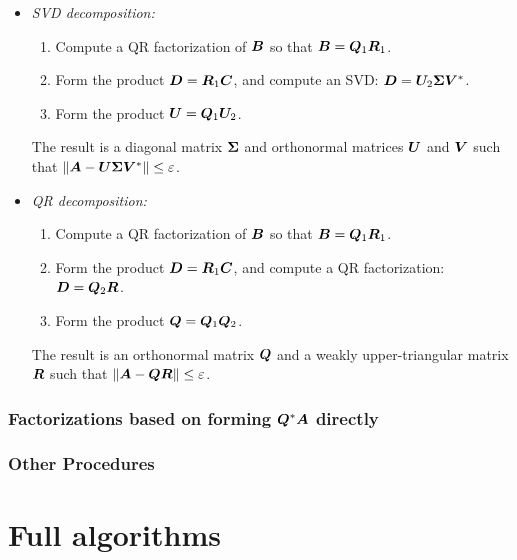 \begin{itemize}
  \item \textit{SVD decomposition:}
\lsp
\begin{enumerate}
\item Compute a QR factorization of $\bm{B}$ so that $\bm{B} = \bm{Q}_{1}\bm{R}_{1}$.
\item Form the product $\bm{D} = \bm{R}_{1}\bm{C}$, and compute an SVD:
      $\bm{D} = \bm{U}_{2}\bm{\Sigma}\bm{V}^{*}$.
\item Form the product $\bm{U} = \bm{Q}_{1}\bm{U}_{2}$.
\end{enumerate}
\lsp
The result is a diagonal matrix $\bm{\Sigma}$ and orthonormal matrices $\bm{U}$ and $\bm{V}$
such that $\left\Vert {\bm{A} - \bm{U}\bm{\Sigma}\bm{V}^{*}} \right\Vert \leq \varepsilon$.

\item \textit{QR decomposition:}
\lsp
\begin{enumerate}
\item Compute a QR factorization of $\bm{B}$ so that $\bm{B} = \bm{Q}_{1}\bm{R}_{1}$.
\item Form the product $\bm{D} = \bm{R}_{1}\bm{C}$, and compute a QR factorization: $\bm{D} = \bm{Q}_{2}\bm{R}$.
\item Form the product $\bm{Q} = \bm{Q}_{1}\bm{Q}_{2}$.
\end{enumerate}
\lsp
The result is an orthonormal matrix  $\bm{Q}$ and a weakly upper-triangular matrix $\bm{R}$ such
that $\left\Vert {\bm{A} - \bm{Q}\bm{R}} \right\Vert \leq \varepsilon$.

\end{itemize}

\subsubsection{Factorizations based on forming $\bm{Q}^*\bm{A}$ directly}
\subsubsection{Other Procedures}

\section{Full algorithms}
